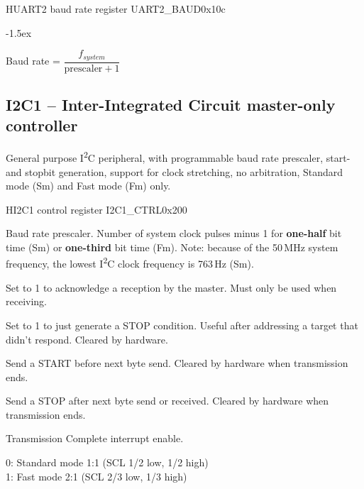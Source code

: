 \documentclass[12pt]{article}
\begin{document}
\begin{register}{H}{UART2 baud rate register UART2\_BAUD}{0x10c}
\label{uart2baud}
%
\regnewline%
\end{register}
\begin{regdesc}[0.6\textwidth]\begin{reglist}[000000000]
\itemsep-1.5ex
\item[PRESCALER] Baud rate = $\dfrac{f_{system}}{\textrm{prescaler}+1}$
\end{reglist}\end{regdesc}


\subsection{I2C1 -- Inter-Integrated Circuit master-only controller}
General purpose I\textsuperscript{2}C peripheral, with programmable baud rate prescaler, start- and stopbit generation, support for clock stretching, no arbitration, Standard mode (Sm) and Fast mode (Fm) only.

\begin{register}{H}{I2C1 control register I2C1\_CTRL}{0x200}
\label{i2c1ctrl}
%
%
%
%
%
%
%
%
%
\regnewline%
\end{register}
\begin{regdesc}[0.9\textwidth]\begin{reglist}[000000000]
\item [BAUD] Baud rate prescaler. Number of system clock pulses minus 1 for \textbf{one-half} bit time (Sm) or \textbf{one-third} bit time (Fm).
Note: because of the 50\,MHz system frequency, the lowest I\textsuperscript{2}C clock frequency is 763\,Hz (Sm).
\item [MACK] Set to 1 to acknowledge a reception by the master. Must only be used when receiving.
\item [HARDSTOP] Set to 1 to just generate a STOP condition. Useful after addressing a target that didn't respond. Cleared by hardware.
\item [START] Send a START before next byte send. Cleared by hardware when transmission ends.
\item [STOP] Send a STOP after next byte send or received. Cleared by hardware when transmission ends.
\item [TCIE] Transmission Complete interrupt enable.
\item [FM] 0: Standard mode 1:1 (SCL 1/2 low, 1/2 high)\\1: Fast mode 2:1 (SCL 2/3 low, 1/3 high)
\end{reglist}\end{regdesc}
\end{document}

